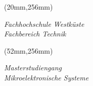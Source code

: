 \begin{titlepage}
{\ITextBlockSupervisionOnCover

\begin{textblock*}{\textwidth}(20mm,256mm)
  \begin{minipage}[b][0cm][t]{\textwidth}
  \fontsize{11pt}{10pt}
  \selectfont
    \begin{flushleft}
      \textit{Fachhochschule Westküste} \\
      \textit{Fachbereich Technik}
    \end{flushleft}
  \end{minipage}
\end{textblock*}

\begin{textblock*}{\textwidth}(52mm,256mm)
  \begin{minipage}[b][0cm][t]{\textwidth}
  \fontsize{11pt}{10pt}
  \selectfont
    \begin{flushright}
      \textit{Masterstudiengang} \\
      \textit{Mikroelektronische Systeme}
    \end{flushright}
  \end{minipage}
\end{textblock*}
}
\end{titlepage}
\                %
